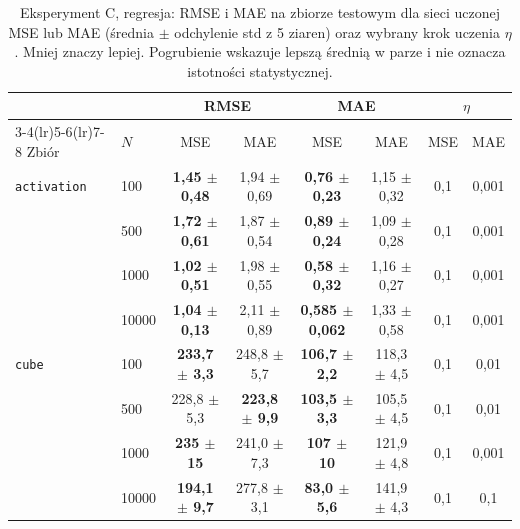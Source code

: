 \documentclass[11pt,a4paper]{article}
\begin{document}
	\begin{table}[H]
		\centering
		\footnotesize
		\setlength{\tabcolsep}{4pt}
		\caption{Eksperyment C, regresja: RMSE i MAE na zbiorze testowym dla sieci uczonej MSE lub MAE (średnia $\pm$ odchylenie std z 5 ziaren) oraz wybrany krok uczenia $\eta$. Mniej znaczy lepiej. Pogrubienie wskazuje lepszą średnią w parze i nie oznacza istotności statystycznej.}\label{tab:C_reg}
		\begin{tabular}{@{}llcccc@{\hspace{12pt}}cc@{}}
			\toprule
			& & \multicolumn{2}{c}{RMSE} & \multicolumn{2}{c}{MAE} & \multicolumn{2}{c}{$\eta$} \\
			\cmidrule(lr){3-4}\cmidrule(lr){5-6}\cmidrule(lr){7-8}
			Zbiór & $N$ & MSE & MAE & MSE & MAE & MSE & MAE \\
			\midrule
			\texttt{activation} & 100 & \textbf{1,45 $\pm$ 0,48} & 1,94 $\pm$ 0,69 & \textbf{0,76 $\pm$ 0,23} & 1,15 $\pm$ 0,32 & 0,1 & 0,001 \\
			& 500 & \textbf{1,72 $\pm$ 0,61} & 1,87 $\pm$ 0,54 & \textbf{0,89 $\pm$ 0,24} & 1,09 $\pm$ 0,28 & 0,1 & 0,001 \\
			& 1000 & \textbf{1,02 $\pm$ 0,51} & 1,98 $\pm$ 0,55 & \textbf{0,58 $\pm$ 0,32} & 1,16 $\pm$ 0,27 & 0,1 & 0,001 \\
			& 10000 & \textbf{1,04 $\pm$ 0,13} & 2,11 $\pm$ 0,89 & \textbf{0,585 $\pm$ 0,062} & 1,33 $\pm$ 0,58 & 0,1 & 0,001 \\
			\midrule
			\texttt{cube} & 100 & \textbf{233,7 $\pm$ 3,3} & 248,8 $\pm$ 5,7 & \textbf{106,7 $\pm$ 2,2} & 118,3 $\pm$ 4,5 & 0,1 & 0,01 \\
			& 500 & 228,8 $\pm$ 5,3 & \textbf{223,8 $\pm$ 9,9} & \textbf{103,5 $\pm$ 3,3} & 105,5 $\pm$ 4,5 & 0,1 & 0,01 \\
			& 1000 & \textbf{235 $\pm$ 15} & 241,0 $\pm$ 7,3 & \textbf{107 $\pm$ 10} & 121,9 $\pm$ 4,8 & 0,1 & 0,001 \\
			& 10000 & \textbf{194,1 $\pm$ 9,7} & 277,8 $\pm$ 3,1 & \textbf{83,0 $\pm$ 5,6} & 141,9 $\pm$ 4,3 & 0,1 & 0,1 \\
			\bottomrule
		\end{tabular}
	\end{table}
	
\end{document}
